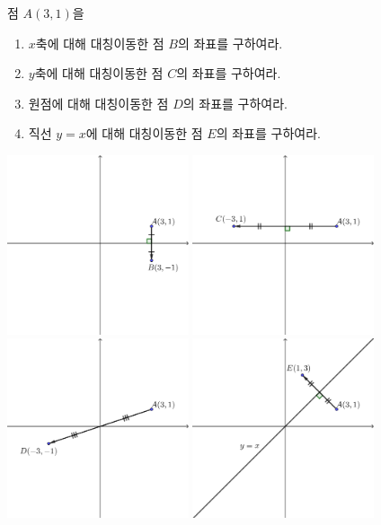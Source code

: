 \documentclass{oblivoir}
\begin{document}
%
\exam{}\label{reflect1}
점 \(A(3,1)\)을
\begin{enumerate}
\item
\(x\)축에 대해 대칭이동한 점 \(B\)의 좌표를 구하여라.
\item
\(y\)축에 대해 대칭이동한 점 \(C\)의 좌표를 구하여라.
\item
원점에 대해 대칭이동한 점 \(D\)의 좌표를 구하여라.
\item
직선 \(y=x\)에 대해 대칭이동한 점 \(E\)의 좌표를 구하여라.
\end{enumerate}
\begin{center}
\bigskip
\includegraphics[width=0.4\textwidth]{reflect_1-1}\quad
\includegraphics[width=0.4\textwidth]{reflect_1-2}\\[30pt]
\includegraphics[width=0.4\textwidth]{reflect_1-3}\quad
\includegraphics[width=0.4\textwidth]{reflect_1-4}
\end{center}
\end{document}
